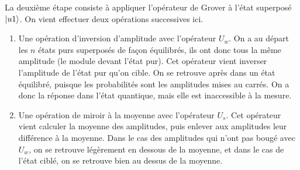 La deuxième étape consiste à appliquer l'opérateur de Grover à l'état superposé $\ket{u1}$. On vient effectuer deux opérations successives ici.

\begin{enumerate}
  \item Une opération d'inversion d'amplitude avec l'opérateur $U_w$. On a au départ les $n$ états purs superposés de façon équilibrés, ils ont donc tous la même amplitude (le module devant l'état pur). Cet opérateur vient inverser l'amplitude de l'état pur qu'on cible. On se retrouve après dans un état équilibré, puisque les probabilités sont les amplitudes mises au carrés. On a donc la réponse dans l'état quantique, mais elle est inaccessible à la mesure.
  \item Une opération de miroir à la moyenne avec l'opérateur $U_s$. Cet opérateur vient calculer la moyenne des amplitudes, puis enlever aux amplitudes leur différence à la moyenne. Dans le cas des amplitudes qui n'ont pas bougé avec $U_w$, on se retrouve légèrement en dessous de la moyenne, et dans le cas de l'état ciblé, on se retrouve bien au dessus de la moyenne.
\end{enumerate}

